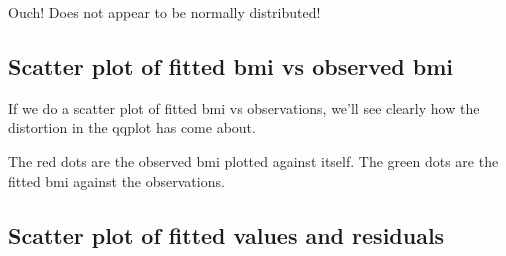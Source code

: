 \documentclass[titlepage]{book}\usepackage{knitr}
\begin{document}
\begin{knitrout}
\color{fgcolor}
\end{knitrout}
Ouch! Does not appear to be normally distributed!

\subsection{Scatter plot of fitted bmi vs observed bmi}

If we do a scatter plot of fitted  bmi vs observations, we'll see clearly how the distortion in the qqplot has come about.

\begin{knitrout}
\color{fgcolor}\begin{kframe}
\begin{alltt}
 \hlopt{+} \hlstd{(}\hlstd{(}     \hlstd{=} \hlstd{)} \hlopt{+} \hlstd{(}\hlstd{(}     \hlstd{=} \hlstd{,}  \hlstd{=} \hlstd{)}
\end{alltt}
\end{kframe}
\end{knitrout}

The red dots are the observed bmi plotted against itself.  The green dots are the fitted bmi against the observations.

\subsection{Scatter plot of fitted values and residuals}

\begin{knitrout}
\color{fgcolor}\begin{kframe}
\begin{alltt}
 \hlkwb{<-}  \hlstd{(}   \hlopt{+} \hlstd{(} \hlstd{=} \hlstd{,}  \hlstd{=} \hlstd{)}
\end{alltt}
\end{kframe}
\end{knitrout}
\end{document}

